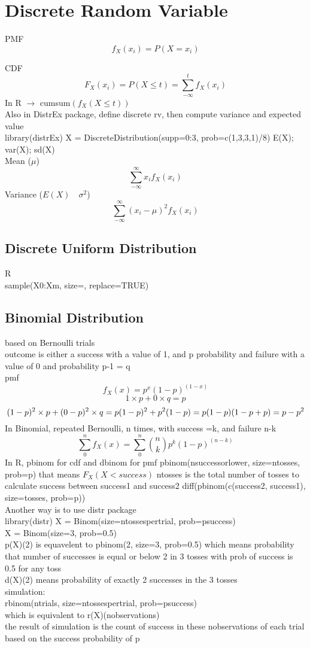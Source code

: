 \documentclass[12pt,a4paper]{report}
\begin{document}
\section{Discrete Random Variable}
PMF
\[
f_X(x_i) = P(X=x_i)
\]

CDF
\[
F_X(x_i) = P(X\leq t) =\sum_{-\infty}^{t} f_X(x_i)
\]
In R $\rightarrow$ cumsum$(f_X(X\leq t))$\\
Also in DistrEx package, define discrete rv, then compute variance and expected value\\
library(distrEx)
X = DiscreteDistribution(supp=0:3, prob=c(1,3,3,1)/8)
E(X); var(X); sd(X)\\
\vspace{5pt}
Mean ($\mu$)
\[
\sum_{-\infty}^{\infty} x_i f_X(x_i)
\]
Variance ($E(X) \quad \sigma^2$)
\[
\sum_{-\infty}^{\infty} (x_i-\mu)^2 f_X(x_i)
\]


\subsection{Discrete Uniform Distribution}
R\\
sample(X0:Xm, size=, replace=TRUE)



\subsection{Binomial Distribution}
based on Bernoulli trials\\
outcome is either a success with a value of 1, and p probability and failure with a value of 0 and probability p-1 = q\\
pmf
\[
f_X(x) =p^x(1-p)^(1-x)
\]
\[
1\times p + 0 \times q = p
\]
\[
(1-p)^2 \times p + (0-p)^2 \times q = p(1-p)^2 + p^2(1-p) \\
= p(1-p)(1-p+p) = p-p^2
\]
In Binomial, repeated Bernoulli, n times, with success =k, and failure n-k
\[
\sum_{0}^{n} f_X(x) =\sum_{0}^{n} \binom{n}{k} p^k(1-p)^(n-k)
\]
In R, pbinom for cdf and dbinom for pmf
pbinom(nsuccessorlower, size=ntosses, prob=p) that means 
$F_X(X<success)$ ntosses is the total number of tosses
to calculate success between success1 and success2
diff(pbinom(c(success2, success1), size=tosses, prob=p))\\
Another way is to use distr package\\
library(distr)
X = Binom(size=ntossespertrial, prob=psuccess)\\
X = Binom(size=3, prob=0.5)\\
p(X)(2) is equavelent to pbinom(2, size=3, prob=0.5) which means probability that number of successes is equal or below 2 in 3 tosses with prob of success is 0.5 for any toss\\
d(X)(2) means probability of exactly 2 successes in the 3 tosses\\
simulation:\\
rbinom(ntrials, size=ntossespertrial, prob=psuccess) \\
which is equivalent to r(X)(nobservations)\\
the result of simulation is the count of success in these nobservations of each trial based on the success probability of p
\end{document}
